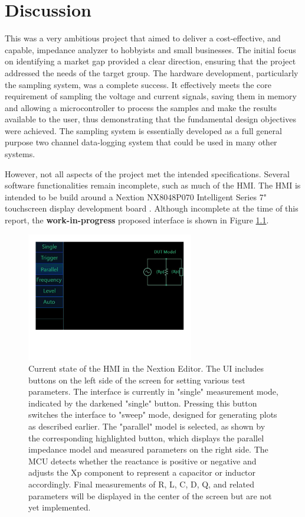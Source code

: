 \chapter{Discussion} \label{ch:Discussion}

This was a very ambitious project that aimed to deliver a cost-effective, and capable, impedance analyzer to hobbyists and small businesses. The initial focus on identifying a market gap provided a clear direction, ensuring that the project addressed the needs of the target group. The hardware development, particularly the sampling system, was a complete success. It effectively meets the core requirement of sampling the voltage and current signals, saving them in memory and allowing a microcontroller to process the samples and make the results available to the user, thus demonstrating that the fundamental design objectives were achieved. The sampling system is essentially developed as a full general purpose two channel data-logging system that could be used in many other systems.

However, not all aspects of the project met the intended specifications. Several software functionalities remain incomplete, such as much of the HMI. The HMI is intended to be build around a Nextion NX8048P070 Intelligent Series 7" touchscreen display development board \cite{NextionDisplay}. Although incomplete at the time of this report, the \textbf{work-in-progress} proposed interface is shown in Figure \ref{fig:7_3_3_NextionHMI}.

\begin{figure}[H] \centering \includegraphics[clip, trim=0 150 0 0, width=0.65\textwidth]{Sections/7_SystemDesign/Figures/7_3_3_UIStatus.pdf} \caption{Current state of the HMI in the Nextion Editor. The UI includes buttons on the left side of the screen for setting various test parameters. The interface is currently in "single" measurement mode, indicated by the darkened "single" button. Pressing this button switches the interface to "sweep" mode, designed for generating plots as described earlier. The "parallel" model is selected, as shown by the corresponding highlighted button, which displays the parallel impedance model and measured parameters on the right side. The MCU detects whether the reactance is positive or negative and adjusts the Xp component to represent a capacitor or inductor accordingly. Final measurements of R, L, C, D, Q, and related parameters will be displayed in the center of the screen but are not yet implemented.} \label{fig:7_3_3_NextionHMI} \end{figure}

